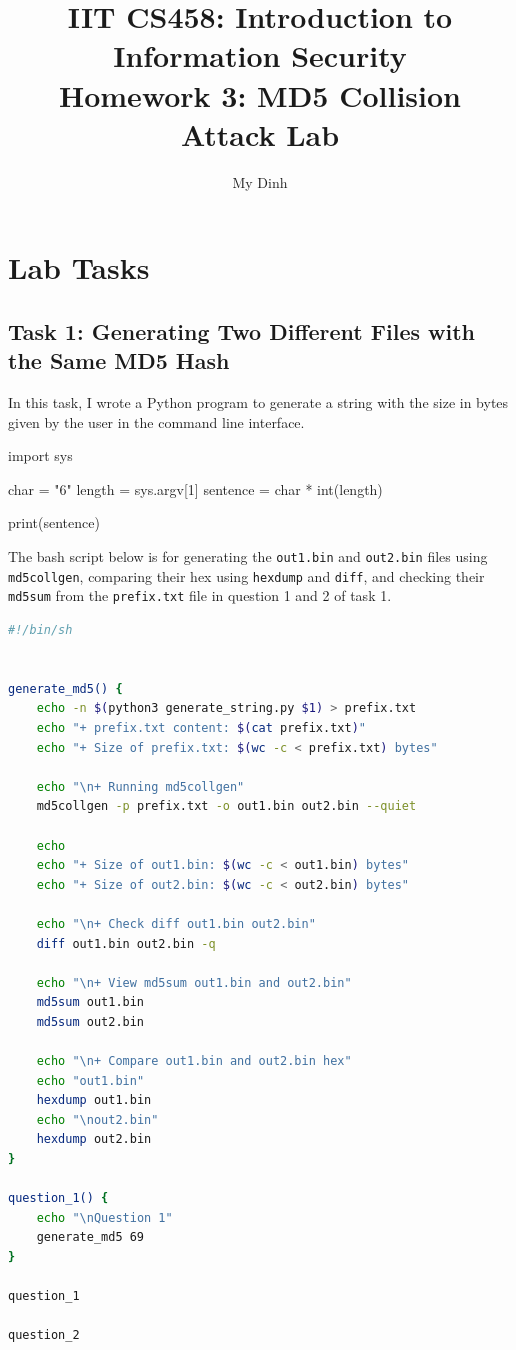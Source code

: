 \documentclass{article}
\title{IIT CS458: Introduction to Information Security\\
  {\large Homework 3: MD5 Collision Attack Lab}}
\author{My Dinh}
\date{}
\begin{document}
\maketitle

\addtocounter{section}{1}

\section{Lab Tasks}

\subsection{Task 1: Generating Two Different Files with the Same MD5 Hash}

In this task, I wrote a Python program to generate a string with the size in
bytes given by the user in the command line interface.

\begin{python}
import sys

char = "6"
length = sys.argv[1]
sentence = char * int(length)

print(sentence)
\end{python}


The bash script below is for generating the \texttt{out1.bin} and \texttt{out2.bin}
files using \texttt{md5collgen}, comparing their hex using \texttt{hexdump} and
\texttt{diff}, and checking their \texttt{md5sum} from the \texttt{prefix.txt}
file in question 1 and 2 of task 1.

\begin{lstlisting}[language=bash]
#!/bin/sh


generate_md5() {
    echo -n $(python3 generate_string.py $1) > prefix.txt
    echo "+ prefix.txt content: $(cat prefix.txt)"
    echo "+ Size of prefix.txt: $(wc -c < prefix.txt) bytes"

    echo "\n+ Running md5collgen"
    md5collgen -p prefix.txt -o out1.bin out2.bin --quiet

    echo
    echo "+ Size of out1.bin: $(wc -c < out1.bin) bytes"
    echo "+ Size of out2.bin: $(wc -c < out2.bin) bytes"

    echo "\n+ Check diff out1.bin out2.bin"
    diff out1.bin out2.bin -q

    echo "\n+ View md5sum out1.bin and out2.bin"
    md5sum out1.bin
    md5sum out2.bin

    echo "\n+ Compare out1.bin and out2.bin hex"
    echo "out1.bin"
    hexdump out1.bin
    echo "\nout2.bin"
    hexdump out2.bin
}

question_1() {
    echo "\nQuestion 1"
    generate_md5 69
}

question_1

question_2
\end{lstlisting}
\end{document}
